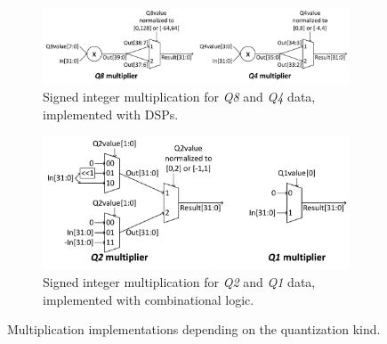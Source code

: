 \documentclass{article}
\begin{document}
\begin{figure}[t]
\centering
\begin{subfigure}{.9\columnwidth}
\centering
\includegraphics[width=\columnwidth]{Figures/Q8Q4mult-eps-converted-to.pdf}
\caption{Signed integer multiplication for \textit{Q8} and \textit{Q4} data, implemented with DSPs.}
\label{fig:Q8Q4mult}
\end{subfigure}
\begin{subfigure}{\columnwidth}
\centering
\includegraphics[width=.7\columnwidth]{Figures/Q2Q1mult-eps-converted-to.pdf}
\caption{Signed integer multiplication for \textit{Q2} and \textit{Q1} data, implemented with combinational logic.}
\label{fig:Q2Q1mult}
\end{subfigure}
\caption{Multiplication implementations depending on the quantization kind.}
\label{fig:Qmult}
\end{figure}
\end{document}
